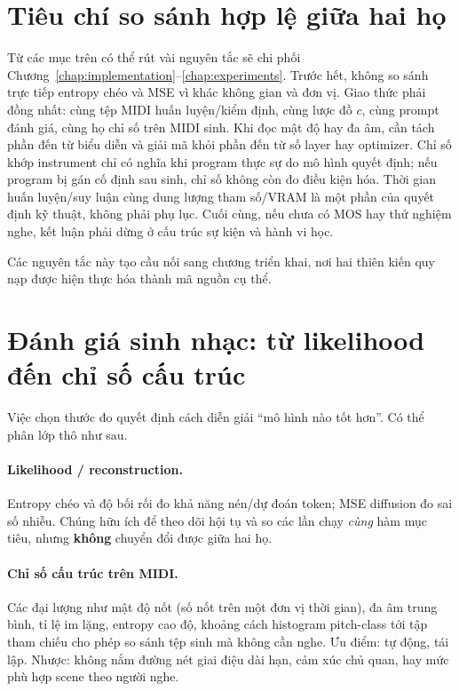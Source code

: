 \section{Tiêu chí so sánh hợp lệ giữa hai họ}
\label{sec:ch2-compare-criteria}

Từ các mục trên có thể rút vài nguyên tắc sẽ chi phối Chương~\ref{chap:implementation}--\ref{chap:experiments}. Trước hết, không so sánh trực tiếp entropy chéo và MSE vì khác không gian và đơn vị. Giao thức phải đồng nhất: cùng tệp MIDI huấn luyện/kiểm định, cùng lược đồ $c$, cùng prompt đánh giá, cùng họ chỉ số trên MIDI sinh. Khi đọc mật độ hay đa âm, cần tách phần đến từ biểu diễn và giải mã khỏi phần đến từ số layer hay optimizer. Chỉ số khớp instrument chỉ có nghĩa khi program thực sự do mô hình quyết định; nếu program bị gán cố định sau sinh, chỉ số không còn đo điều kiện hóa. Thời gian huấn luyện/suy luận cùng dung lượng tham số/VRAM là một phần của quyết định kỹ thuật, không phải phụ lục. Cuối cùng, nếu chưa có MOS hay thử nghiệm nghe, kết luận phải dừng ở cấu trúc sự kiện và hành vi học.

Các nguyên tắc này tạo cầu nối sang chương triển khai, nơi hai thiên kiến quy nạp được hiện thực hóa thành mã nguồn cụ thể.

\section{Đánh giá sinh nhạc: từ likelihood đến chỉ số cấu trúc}
\label{sec:ch2-eval-theory}

Việc chọn thước đo quyết định cách diễn giải ``mô hình nào tốt hơn''. Có thể phân lớp thô như sau.

\paragraph{Likelihood / reconstruction.}
Entropy chéo và độ bối rối đo khả năng nén/dự đoán token; MSE diffusion đo sai số nhiễu. Chúng hữu ích để theo dõi hội tụ và so các lần chạy \textit{cùng} hàm mục tiêu, nhưng \textbf{không} chuyển đổi được giữa hai họ.

\paragraph{Chỉ số cấu trúc trên MIDI.}
Các đại lượng như mật độ nốt (số nốt trên một đơn vị thời gian), đa âm trung bình, tỉ lệ im lặng, entropy cao độ, khoảng cách histogram pitch-class tới tập tham chiếu cho phép so sánh tệp sinh mà không cần nghe. Ưu điểm: tự động, tái lập. Nhược: không nắm đường nét giai điệu dài hạn, cảm xúc chủ quan, hay mức phù hợp scene theo người nghe.

